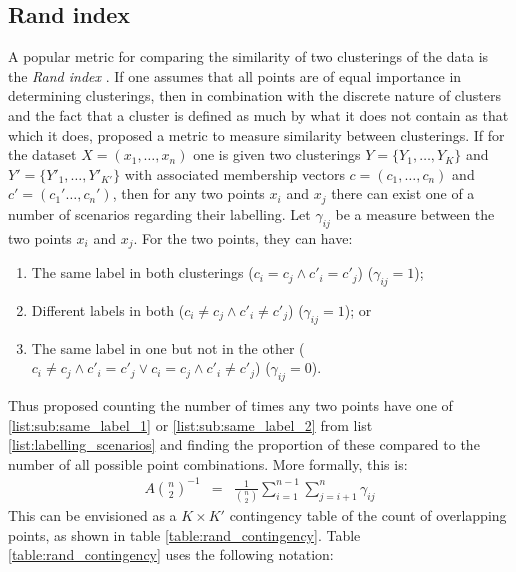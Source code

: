 \documentclass[12pt]{article} %
\begin{document}
	\subsection{Rand index} \label{sec:rand_index}
	A popular metric for comparing the similarity of two clusterings of the data is the \emph{Rand index} \citep{RandObjectiveCriteriaEvaluation1971}. If one assumes that all points are of equal importance in determining clusterings, then in combination with the discrete nature of clusters and the fact that a cluster is defined as much by what it does not contain as that which it does, \citet{RandObjectiveCriteriaEvaluation1971} proposed a metric to measure similarity between clusterings. If for the dataset $X=(x_1,\ldots,x_n)$ one is given two clusterings $Y=\{Y_1,\ldots,Y_{K}\}$ and $Y'=\{Y'_1,\ldots,Y'_{K'}\}$ with associated membership vectors $c=(c_1,\ldots,c_n)$ and $c'=(c_1'\ldots,c_n')$, then for any two points $x_i$ and $x_j$ there can exist one of a number of scenarios regarding their labelling. Let $\gamma_{ij}$ be a measure between the two points $x_i$ and $x_j$. For the two points, they can have:
	\begin{enumerate} \label{list:labelling_scenarios}
		\item The same label in both clusterings ($c_i = c_j \land c'_i = c'_j$) ($\gamma_{ij}=1$); \label{list:sub:same_label_1}
		\item Different labels in both ($c_i \neq c_j \land c'_i \neq c'_j$) ($\gamma_{ij}=1$); or \label{list:sub:same_label_2}
		\item The same label in one but not in the other ($c_i \neq c_j \land c'_i = c'_j \lor c_i = c_j \land c'_i \neq c'_j$) ($\gamma_{ij}=0$). \label{list:sub:different_label}
	\end{enumerate}
	Thus \citet{RandObjectiveCriteriaEvaluation1971} proposed counting the number of times any two points have one of \ref{list:sub:same_label_1} or \ref{list:sub:same_label_2} from list \ref{list:labelling_scenarios} and finding the proportion of these compared to the number of all possible point combinations. More formally, this is:
	\begin{eqnarray} \label{eqn:rand_index}
	A \binom{n}{2}^{-1} & = & \frac{1}{\binom{n}{2}} \sum_{i=1}^{n-1}\sum_{j=i + 1}^n\gamma_{ij} 
	\end{eqnarray}
	This can be envisioned as a $K \times K'$ contingency table of the count of overlapping points, as shown in table \ref{table:rand_contingency}. Table \ref{table:rand_contingency} uses the following notation:
\end{document}
